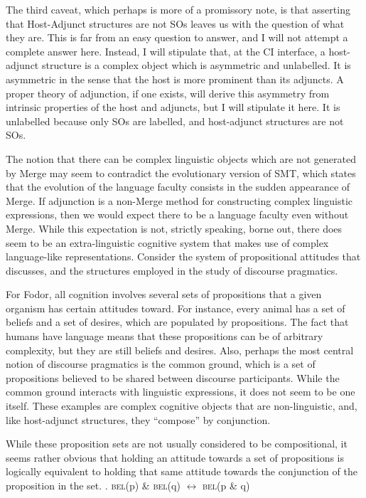 \documentclass[MilwayThesis]{subfiles}
\begin{document}
The third caveat, which perhaps is more of a promissory note, is that asserting that Host-Adjunct structures are not SOs leaves us with the question of what they are.
This is far from an easy question to answer, and I will not attempt a complete answer here.
Instead, I will stipulate that, at the CI interface, a host-adjunct structure is a complex object which is asymmetric and unlabelled.
It is asymmetric in the sense that the host is more prominent than its adjuncts.
A proper theory of adjunction, if one exists, will derive this asymmetry from intrinsic properties of the host and adjuncts, but I will stipulate it here.
It is unlabelled because only SOs are labelled, and host-adjunct structures are not SOs.

The notion that there can be complex linguistic objects which are not generated by Merge may seem to contradict the evolutionary version of SMT, which states that the evolution of the language faculty consists in the sudden appearance of Merge.
If adjunction is a non-Merge method for constructing complex linguistic expressions, then we would expect there to be a language faculty even without Merge.
While this expectation is not, strictly speaking, borne out, there does seem to be an extra-linguistic cognitive system that makes use of complex language-like representations.
Consider the system of propositional attitudes that \textcite{fodor1975language} discusses, and the structures employed in the study of discourse pragmatics.

For Fodor, all cognition involves several sets of propositions that a given organism has certain attitudes toward.
For instance, every animal has a set of beliefs and a set of desires, which are populated by propositions.
The fact that humans have language means that these propositions can be of arbitrary complexity, but they are still beliefs and desires.
Also, perhaps the most central notion of discourse pragmatics is the common ground, which is a set of propositions believed to be shared between discourse participants.
While the common ground interacts with linguistic expressions, it does not seem to be one itself.
These examples are complex cognitive objects that are non-linguistic, and, like host-adjunct structures, they ``compose'' by conjunction.

While these proposition sets are not usually considered to be compositional, it seems rather obvious that holding an attitude towards a set of propositions is logically equivalent to holding that same attitude towards the conjunction of the proposition in the set.
\ex. \textsc{bel}(p) \& \textsc{bel}(q) $\leftrightarrow$ \textsc{bel}(p \& q)
\end{document}
